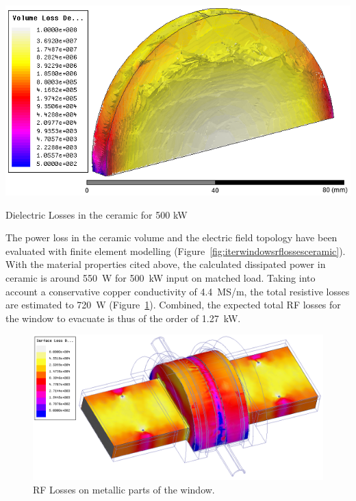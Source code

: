 \begin{marginfigure}
	\centering
	\includegraphics[width=1.0\linewidth]{figures/chap3/ITER_window/ITER_windows_RFlosses_ceramic}
	\caption{Dielectric Losses in the ceramic for 500 kW}
	\label{fig:iterwindowsrflossesceramic}
\end{marginfigure}

The power loss in the ceramic volume and the electric field topology have been evaluated with finite element modelling (Figure~\ref{fig:iterwindowsrflossesceramic}). With the material properties cited above, the calculated dissipated power in ceramic is around 550~W for 500~kW input on matched load. Taking into account a conservative copper conductivity of 4.4~MS/m, the total resistive losses are estimated to 720~W (Figure~\ref{fig:iterwindowsrflosses}). Combined, the expected total RF losses for the window to evacuate is thus of the order of 1.27~kW. 

\begin{figure}
	\centering
	\includegraphics[width=1.0\linewidth]{figures/chap3/ITER_window/ITER_windows_RFlosses}
	\caption{RF Losses on metallic parts of the window.}
	\label{fig:iterwindowsrflosses}
\end{figure}


